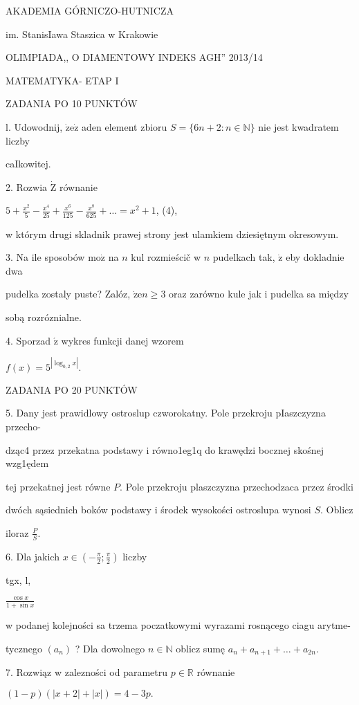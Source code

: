 \documentclass[a4paper,12pt]{article}
\begin{document}
AKADEMIA GÓRNICZO-HUTNICZA

im. StanisIawa Staszica w Krakowie

OLIMPIADA,, O DIAMENTOWY INDEKS AGH'' 2013/14

MATEMATYKA- ETAP I

ZADANIA PO 10 PUNKTÓW

l. Udowodnij, $\dot{\mathrm{z}}\mathrm{e}\dot{\mathrm{z}}$ aden element zbioru $S=\{6n+2:n\in \mathbb{N}\}$ nie jest kwadratem liczby

caIkowitej.

2. Rozwia $\dot{\mathrm{Z}}$ równanie

$ 5+\displaystyle \frac{x^{2}}{5}-\frac{x^{4}}{25}+\frac{x^{6}}{125}-\frac{x^{8}}{625}+\ldots = x^{2}+1$, (4),

w którym drugi skladnik prawej strony jest ulamkiem dziesiętnym okresowym.

3. Na ile sposobów $\mathrm{m}\mathrm{o}\dot{\mathrm{z}}$ na $n$ kul rozmieścič w $n$ pudelkach tak, $\dot{\mathrm{z}}$ eby dokladnie dwa

pudelka zostaly puste? Zalóz, $\dot{\mathrm{z}}\mathrm{e}n\geq 3$ oraz zarówno kule jak i pudelka sa między

sobą rozróznialne.

4. Sporzad $\acute{\mathrm{z}}$ wykres funkcji danej wzorem

$f(x)=5^{|\log_{0,2}x|}.$

ZADANIA PO 20 PUNKTÓW

5. Dany jest prawidlowy ostroslup czworokatny. Pole przekroju pIaszczyzna przecho-

dząc4 przez przekatna podstawy i równo1eg1q do krawędzi bocznej skośnej wzg1ędem

tej przekatnej jest równe $P$. Pole przekroju plaszczyzna przechodzaca przez środki

dwóch sąsiednich boków podstawy i środek wysokości ostroslupa wynosi $S$. Oblicz

iloraz $\displaystyle \frac{P}{S}.$

6. Dla jakich $ x\in (-\displaystyle \frac{\pi}{2};\frac{\pi}{2})$ liczby

tgx, l,

$\displaystyle \frac{\cos x}{1+\sin x}$

w podanej kolejności sa trzema poczatkowymi wyrazami rosnącego ciagu arytme-

tycznego $(a_{n})$ ? Dla dowolnego $n\in \mathbb{N}$ oblicz sumę $a_{n}+a_{n+1}+\ldots+a_{2n}.$

7. Rozwiąz w zalezności od parametru $p\in \mathbb{R}$ równanie

$(1-p)(|x+2|+|x|)=4-3p.$
\end{document}
